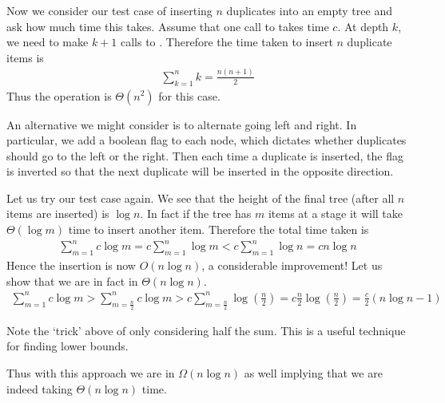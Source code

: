 Now we consider our test case of inserting $n$ duplicates into an empty tree and ask how much time this takes. Assume that one call to  takes time $c$. At depth $k$, we need to make $k + 1$ calls to . Therefore the time taken to insert $n$ duplicate items is
\begin{align*}
    \sum_{k = 1}^{n} k = \frac{n(n + 1)}{2}
\end{align*}
Thus the operation is $\Theta(n^2)$ for this case.

An alternative we might consider is to alternate going left and right. In particular, we add a boolean flag to each node, which dictates whether duplicates should go to the left or the right. Then each time a duplicate is inserted, the flag is inverted so that the next duplicate will be inserted in the opposite direction.


Let us try our test case again. We see that the height of the final tree (after all $n$ items are inserted) is $\log n$. In fact if the tree has $m$ items at a stage it will take $\Theta(\log m)$ time to insert another item. Therefore the total time taken is
\begin{align*}
    \sum_{m = 1}^{n} c \log m = c \sum_{m = 1}^{n} \log m < c \sum_{m = 1}^{n} \log n = c n \log n
\end{align*}
Hence the insertion is now $O(n \log n)$, a considerable improvement! Let us show that we are in fact in $\Theta(n \log n)$.
\begin{align*}
    \sum_{m = 1}^{n} c \log m > \sum_{m = \frac{n}{2}}^{n}c \log m > c \sum_{m = \frac{n}{2}}^{n} \log \left(\frac{n}{2}\right) = c \frac{n}{2} \log \left( \frac{n}{2} \right) = \frac{c}{2}(n \log n - 1)
\end{align*}
\begin{remark}
    Note the `trick' above of only considering half the sum. This is a useful technique for finding lower bounds.
\end{remark}
Thus with this approach we are in $\Omega(n \log n)$ as well implying that we are indeed taking $\Theta(n \log n)$ time.